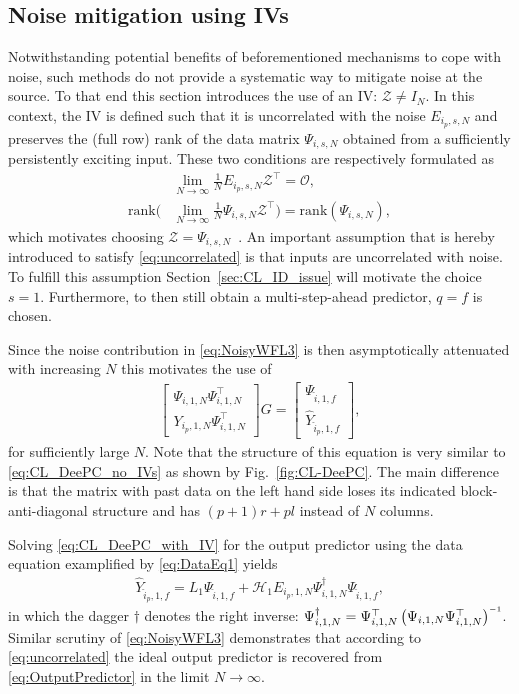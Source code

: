 \subsection{Noise mitigation using \acl{IVs}}
Notwithstanding potential benefits of beforementioned mechanisms to cope with noise, such methods do not provide a systematic way to mitigate noise at the source. To that end this section introduces the use of an \ac{IV}: $\mathcal{Z}\neq I_N$. In this context, the \ac{IV} is defined such that it is uncorrelated with the noise $E_{i_p,s,N}$ and preserves the (full row) rank of the data matrix $\Psi_{i,s,N}$ obtained from a sufficiently persistently exciting input. These two conditions are respectively formulated as
%
\begin{align}
    &\lim_{N\rightarrow\infty} \frac{1}{N}E_{i_p,s,N}\mathcal{Z}^\top = \mathcal{O},\label{eq:uncorrelated}\\
    \text{rank}\biggl(&\lim_{N\rightarrow\infty} \frac{1}{N}\Psi_{i,s,N}\mathcal{Z}^\top\biggl) =  \text{rank}(\Psi_{i,s,N}),\label{eq:rankconservation}
\end{align}
%
which motivates choosing $\mathcal{Z}=\Psi_{i,s,N}$~\cite[Chapt. 9.6]{Verhaegen2007a}. An important assumption that is hereby introduced to satisfy \eqref{eq:uncorrelated} is that inputs are uncorrelated with noise. To fulfill this assumption Section~\ref{sec:CL_ID_issue} will motivate the choice $s=1$. Furthermore, to then still obtain a multi-step-ahead predictor, $q=f$ is chosen.

Since the noise contribution in \eqref{eq:NoisyWFL3} is then asymptotically attenuated with increasing $N$ this motivates the use of
\begin{align}\label{eq:CL_DeePC_with_IV}
    \begin{bmatrix}
   \Psi_{i,1,N}\Psi_{i,1,N}^\top\\
   \hline
   Y_{i_p,1,N}\Psi_{i,1,N}^\top
    \end{bmatrix}
G =
\begin{bmatrix}
    \Psi_{\hat{i},1,f}\\
    \hline
    \widehat{Y}_{\hat{i}_p,1,f}
\end{bmatrix},
\end{align}
for sufficiently large $N$. Note that the structure of this equation is very similar to \eqref{eq:CL_DeePC_no_IVs} as shown by Fig.~\ref{fig:CL-DeePC}. The main difference is that the matrix with past data on the left hand side loses its indicated block-anti-diagonal structure and has $(p+1)r+pl$ instead of $N$ columns.

Solving \eqref{eq:CL_DeePC_with_IV} for the output predictor using the data equation examplified by \eqref{eq:DataEq1} yields
\begin{align}\label{eq:OutputPredictor}
    \widehat{Y}_{\hat{i}_p,1,f} = L_1 \Psi_{\hat{i},1,f} + \mathcal{H}_1 E_{i_p,1,N}\Psi_{i,1,N}^\dagger\Psi_{\hat{i},1,f},
\end{align}
in which the dagger $\dagger$ denotes the right inverse: ${\Psi_{i,1,N}^\dagger=\Psi_{i,1,N}^\top\left(\Psi_{i,1,N}\Psi_{i,1,N}^\top\right)\inv}$. Similar scrutiny of \eqref{eq:NoisyWFL3} demonstrates that according to \eqref{eq:uncorrelated} the ideal output predictor is recovered from \eqref{eq:OutputPredictor} in the limit $N\rightarrow\infty$.